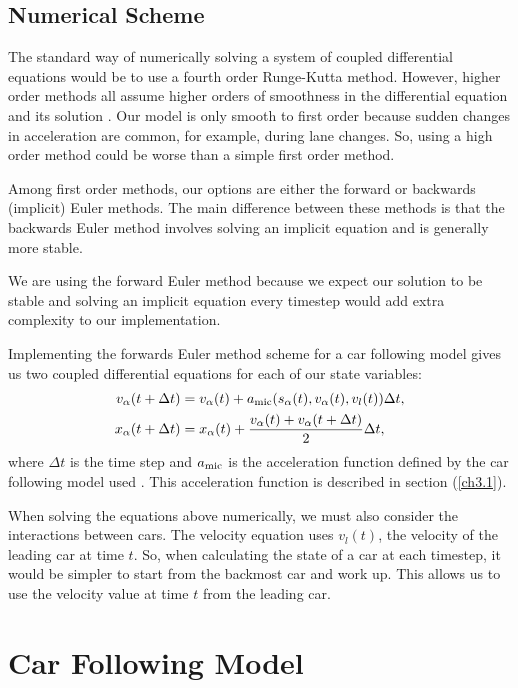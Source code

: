 \documentclass[12pt]{article}
\begin{document}
    \subsection{Numerical Scheme}\label{num_sch}
    The standard way of numerically solving a system of coupled differential equations would be to use a fourth order Runge-Kutta method.
    However, higher order methods all assume higher orders of smoothness in the differential equation and its solution \cite{numerics}.
    Our model is only smooth to first order because sudden changes in acceleration are common, for example, during lane changes. 
    So, using a high order method could be worse than a simple first order method.

    Among first order methods, our options are either the forward or backwards (implicit) Euler methods. The main difference between these methods is that the backwards Euler method involves solving an implicit equation and is generally more stable.

    We are using the forward Euler method because we expect our solution to be stable and solving an implicit equation every timestep would add extra complexity to our implementation.

    Implementing the forwards Euler method scheme for a car following model gives us two coupled differential equations for each of our state variables:
    \begin{align}
        v_\alpha(t+\Delta t) &= v_\alpha(t) +a_{\rm mic}(s_\alpha(t), v_\alpha (t), v_l (t))\Delta t, \label{num_eq1}\\
        x_\alpha(t + \Delta t) &= x_\alpha(t) + \frac{v_\alpha (t) + v_\alpha (t+\Delta t)}{2}\Delta t \label{num_eq2},
    \end{align}
    where $\Delta t$ is the time step and $a_{\rm mic}$ is the acceleration function defined by the car following model used \cite{traffic}. This acceleration function is described in section (\ref{ch3.1}).

    When solving the equations above numerically, we must also consider the interactions between cars. The velocity equation uses $v_l(t)$, the velocity of the leading car at time $t$. So, when calculating the state of a car at each timestep, it would be simpler to start from the backmost car and work up. This allows us to use the velocity value at time $t$ from the leading car.     

    \section{Car Following Model}
\end{document}
